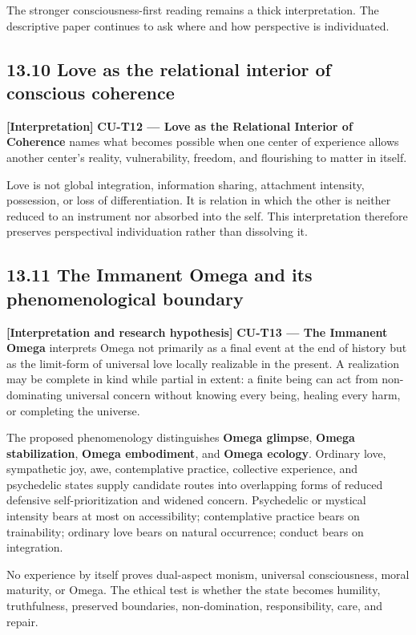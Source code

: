 \documentclass[
  11pt,
]{article}
\begin{document}
The stronger consciousness-first reading remains a thick interpretation.
The descriptive paper continues to ask where and how perspective is
individuated.

\subsection{13.10 Love as the relational interior of conscious
coherence}\label{love-as-the-relational-interior-of-conscious-coherence}

\textbf{{[}Interpretation{]}} \textbf{CU-T12 --- Love as the Relational
Interior of Coherence} names what becomes possible when one center of
experience allows another center's reality, vulnerability, freedom, and
flourishing to matter in itself.

Love is not global integration, information sharing, attachment
intensity, possession, or loss of differentiation. It is relation in
which the other is neither reduced to an instrument nor absorbed into
the self. This interpretation therefore preserves perspectival
individuation rather than dissolving it.

\subsection{13.11 The Immanent Omega and its phenomenological
boundary}\label{the-immanent-omega-and-its-phenomenological-boundary}

\textbf{{[}Interpretation and research hypothesis{]}} \textbf{CU-T13 ---
The Immanent Omega} interprets Omega not primarily as a final event at
the end of history but as the limit-form of universal love locally
realizable in the present. A realization may be complete in kind while
partial in extent: a finite being can act from non-dominating universal
concern without knowing every being, healing every harm, or completing
the universe.

The proposed phenomenology distinguishes \textbf{Omega glimpse},
\textbf{Omega stabilization}, \textbf{Omega embodiment}, and
\textbf{Omega ecology}. Ordinary love, sympathetic joy, awe,
contemplative practice, collective experience, and psychedelic states
supply candidate routes into overlapping forms of reduced defensive
self-prioritization and widened concern. Psychedelic or mystical
intensity bears at most on accessibility; contemplative practice bears
on trainability; ordinary love bears on natural occurrence; conduct
bears on integration.

No experience by itself proves dual-aspect monism, universal
consciousness, moral maturity, or Omega. The ethical test is whether the
state becomes humility, truthfulness, preserved boundaries,
non-domination, responsibility, care, and repair.
\end{document}
